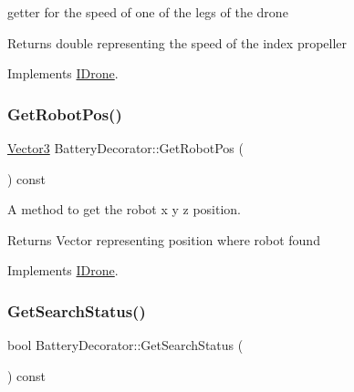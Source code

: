 getter for the speed of one of the legs of the drone 

\begin{DoxyReturn}{Returns}
double representing the speed of the index propeller 
\end{DoxyReturn}


Implements \hyperlink{classIDrone_a60a9a7eb90bf13100d66cb47b99830ed}{I\+Drone}.

\mbox{\label{classBatteryDecorator_ac9f7223d439db341e9765ea3d5584f4e}} 
\subsubsection{\texorpdfstring{Get\+Robot\+Pos()}{GetRobotPos()}}
{\footnotesize\ttfamily \hyperlink{classVector3}{Vector3} Battery\+Decorator\+::\+Get\+Robot\+Pos (\begin{DoxyParamCaption}{ }\end{DoxyParamCaption}) const\hspace{0.3cm}{\ttfamily [virtual]}}



A method to get the robot x y z position. 

\begin{DoxyReturn}{Returns}
Vector representing position where robot found 
\end{DoxyReturn}


Implements \hyperlink{classIDrone_a1c3f5e712a97625c74c35952b930d68d}{I\+Drone}.

\mbox{\label{classBatteryDecorator_aa0358ef7a9aee0f4942d32ad15ce4675}} 
\subsubsection{\texorpdfstring{Get\+Search\+Status()}{GetSearchStatus()}}
{\footnotesize\ttfamily bool Battery\+Decorator\+::\+Get\+Search\+Status (\begin{DoxyParamCaption}{ }\end{DoxyParamCaption}) const\hspace{0.3cm}{\ttfamily [virtual]}}



